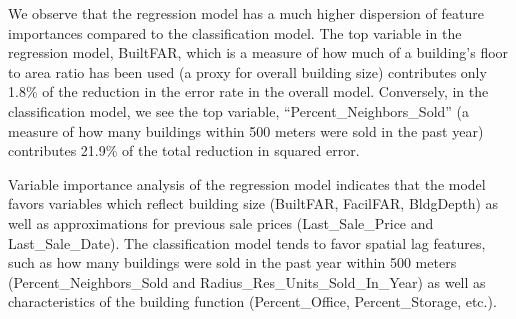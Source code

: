 \documentclass[12pt,]{article}
\begin{document}
\begin{table}

\caption{\label{tab:Class VarImp}\label{tab:ClassVarImp} Feature Importance of Top Performing Classification Model}
\centering
{}
\end{table}

We observe that the regression model has a much higher dispersion of
feature importances compared to the classification model. The top
variable in the regression model, BuiltFAR, which is a measure of how
much of a building's floor to area ratio has been used (a proxy for
overall building size) contributes only 1.8\% of the reduction in the
error rate in the overall model. Conversely, in the classification
model, we see the top variable, ``Percent\_Neighbors\_Sold'' (a measure
of how many buildings within 500 meters were sold in the past year)
contributes 21.9\% of the total reduction in squared error.

Variable importance analysis of the regression model indicates that the
model favors variables which reflect building size (BuiltFAR, FacilFAR,
BldgDepth) as well as approximations for previous sale prices
(Last\_Sale\_Price and Last\_Sale\_Date). The classification model tends
to favor spatial lag features, such as how many buildings were sold in
the past year within 500 meters (Percent\_Neighbors\_Sold and
Radius\_Res\_Units\_Sold\_In\_Year) as well as characteristics of the
building function (Percent\_Office, Percent\_Storage, etc.).
\end{document}
